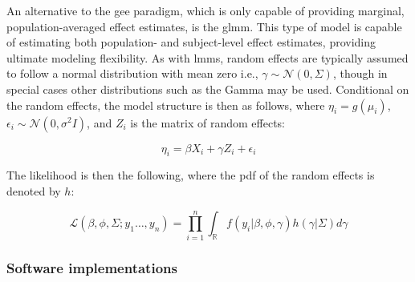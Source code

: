 \documentclass{report}
\begin{document}
An alternative to the \gls{gee} paradigm, which is only capable of providing marginal, population-averaged effect estimates, is the \gls{glmm}. This type of model is capable of estimating both population- and subject-level effect estimates, providing ultimate modeling flexibility. As with \glspl{lmm}, random effects are typically assumed to follow a normal distribution with mean zero i.e., $\gamma \sim \mathcal{N}(0, \Sigma)$, though in special cases other distributions such as the Gamma may be used. Conditional on the random effects, the model structure is then as follows, where $\eta_i = g(\mu_i)$, $\epsilon_i \sim \mathcal{N}(0, \sigma^2I)$, and $Z_i$ is the matrix of random effects:

\begin{equation}\label{eq:glm-glmm-model-form}
    \eta_i = \beta X_i + \gamma Z_i + \epsilon_i
\end{equation}

The likelihood is then the following, where the \gls{pdf} of the random effects is denoted by $h$:

\begin{equation}\label{eq:glm-glmm-model-likelihood}
    \mathcal{L}\left(\beta, \phi, \Sigma; y_1 \dots, y_n\right) = \prod_{i=1}^n \int_{\mathbb{R}} f(y_i|\beta, \phi, \gamma) h(\gamma|\Sigma) d\gamma
\end{equation}

\subsubsection{Software implementations}
\end{document}

